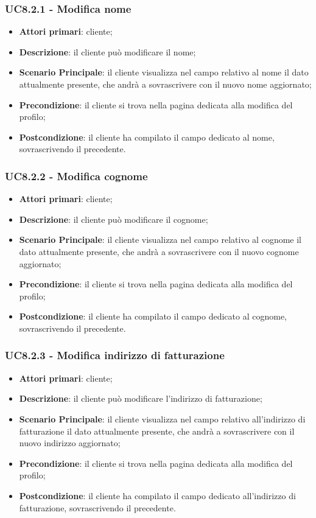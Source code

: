 \subsubsection{UC8.2.1 - Modifica nome}
\begin{itemize}
\item \textbf{Attori primari}: cliente;
\item \textbf{Descrizione}: il cliente può modificare il nome;
\item \textbf{Scenario Principale}: il cliente visualizza nel campo relativo al nome il dato attualmente presente, che andrà a sovrascrivere con il nuovo nome aggiornato;
\item \textbf{Precondizione}: il cliente si trova nella pagina dedicata alla modifica del profilo;
\item \textbf{Postcondizione}: il cliente ha compilato il campo dedicato al nome, sovrascrivendo il precedente.
\end{itemize}

\subsubsection{UC8.2.2 - Modifica cognome}
\begin{itemize}
\item \textbf{Attori primari}: cliente;
\item \textbf{Descrizione}: il cliente può modificare il cognome;
\item \textbf{Scenario Principale}: il cliente visualizza nel campo relativo al cognome il dato attualmente presente, che andrà a sovrascrivere con il nuovo cognome aggiornato;
\item \textbf{Precondizione}: il cliente si trova nella pagina dedicata alla modifica del profilo;
\item \textbf{Postcondizione}: il cliente ha compilato il campo dedicato al cognome, sovrascrivendo il precedente.
\end{itemize}

\subsubsection{UC8.2.3 - Modifica indirizzo di fatturazione}
\begin{itemize}
\item \textbf{Attori primari}: cliente;
\item \textbf{Descrizione}: il cliente può modificare l'indirizzo di fatturazione;
\item \textbf{Scenario Principale}: il cliente visualizza nel campo relativo all'indirizzo di fatturazione il dato attualmente presente, che andrà a sovrascrivere con il nuovo indirizzo aggiornato;
\item \textbf{Precondizione}: il cliente si trova nella pagina dedicata alla modifica del profilo;
\item \textbf{Postcondizione}: il cliente ha compilato il campo dedicato all'indirizzo di fatturazione, sovrascrivendo il precedente.
\end{itemize}

